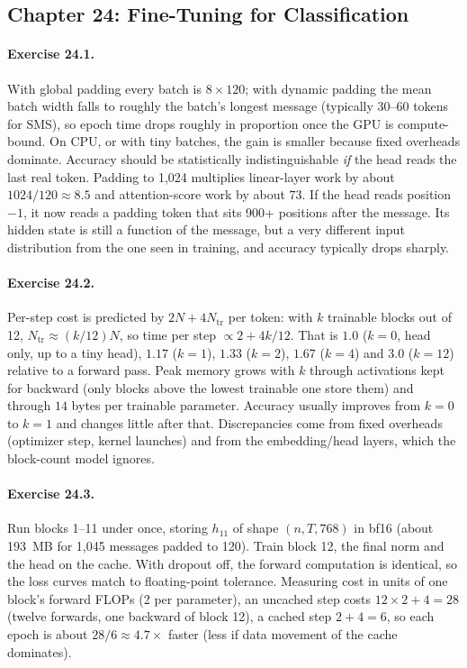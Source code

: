 \subsection*{Chapter 24: Fine-Tuning for Classification}

\paragraph{Exercise 24.1.} With global padding every batch is $8\times120$; with dynamic
padding the mean batch width falls to roughly the batch's longest message (typically
30--60 tokens for SMS), so epoch time drops roughly in proportion once the GPU is
compute-bound. On CPU, or with tiny batches, the gain is smaller because fixed overheads
dominate. Accuracy should be statistically indistinguishable \emph{if} the head reads
the last real token. Padding to 1{,}024 multiplies linear-layer work by about
$1024/120\approx8.5$ and attention-score work by about $73$. If the head reads position
$-1$, it now reads a padding token that sits 900+ positions after the message. Its
hidden state is still a function of the message, but a very different input
distribution from the one seen in training, and accuracy typically drops sharply.

\paragraph{Exercise 24.2.} Per-step cost is predicted by $2N + 4N_{\text{tr}}$ per token:
with $k$ trainable blocks out of 12, $N_{\text{tr}}\approx (k/12)N$, so time per step
$\propto 2 + 4k/12$. That is $1.0$ ($k=0$, head only, up to a tiny head), $1.17$
($k=1$), $1.33$ ($k=2$), $1.67$ ($k=4$) and $3.0$ ($k=12$) relative to a forward pass.
Peak memory grows with $k$ through activations kept for backward (only blocks above the
lowest trainable one store them) and through $14$ bytes per trainable parameter.
Accuracy usually improves from $k=0$ to $k=1$ and changes little after that.
Discrepancies come from fixed overheads (optimizer step, kernel launches) and from the
embedding/head layers, which the block-count model ignores.

\paragraph{Exercise 24.3.} Run blocks 1--11 under  once, storing
$h_{11}$ of shape $(n, T, 768)$ in bf16 (about \SI{193}{MB} for 1{,}045 messages padded
to 120). Train block 12, the final norm and the head on the cache. With dropout off,
the forward computation is identical, so the loss curves match to floating-point
tolerance. Measuring cost in units of one block's forward FLOPs (2 per parameter), an uncached step costs $12\times2 + 4 = 28$ (twelve forwards, one backward of block 12), a cached step $2+4=6$, so each epoch is about $28/6\approx4.7\times$ faster (less if data movement of the cache dominates).

